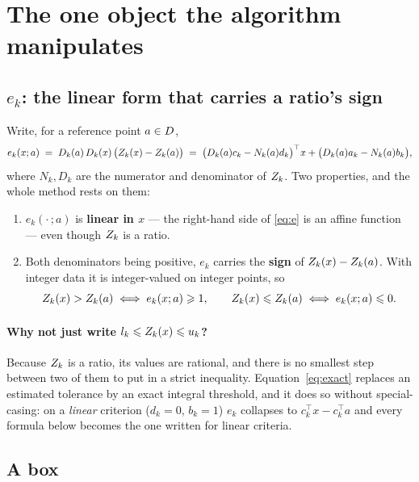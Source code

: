 \documentclass[11pt,a4paper]{article}
\begin{document}
\section{The one object the algorithm manipulates}

\subsection{$e_k$: the linear form that carries a ratio's sign}

Write, for a reference point $a \in D$,
\begin{equation}\label{eq:e}
  e_k(x;a) \;=\; D_k(a)\, D_k(x)\, \bigl( Z_k(x) - Z_k(a) \bigr)
  \;=\; \bigl(D_k(a) c_k - N_k(a) d_k\bigr)^{\top} x
      + \bigl(D_k(a) a_k - N_k(a) b_k\bigr),
\end{equation}
where $N_k, D_k$ are the numerator and denominator of $Z_k$.  Two properties,
and the whole method rests on them:

\begin{enumerate}
\item $e_k(\cdot\,;a)$ is \textbf{linear in $x$} --- the right-hand side of
  \eqref{eq:e} is an affine function --- even though $Z_k$ is a ratio.
\item Both denominators being positive, $e_k$ carries the \textbf{sign} of
  $Z_k(x) - Z_k(a)$.  With integer data it is integer-valued on integer
  points, so
  \begin{equation}\label{eq:exact}
    Z_k(x) > Z_k(a) \iff e_k(x;a) \geqslant 1,
    \qquad
    Z_k(x) \leqslant Z_k(a) \iff e_k(x;a) \leqslant 0 .
  \end{equation}
\end{enumerate}

\paragraph{Why not just write $l_k \leqslant Z_k(x) \leqslant u_k$?}  Because
$Z_k$ is a ratio, its values are rational, and there is no smallest step
between two of them to put in a strict inequality.  Equation~\eqref{eq:exact}
replaces an estimated tolerance by an exact integral threshold, and it does so
without special-casing: on a \emph{linear} criterion ($d_k = 0$, $b_k = 1$)
$e_k$ collapses to $c_k^{\top}x - c_k^{\top}a$ and every formula below becomes
the one written for linear criteria.

\subsection{A box}
\end{document}

